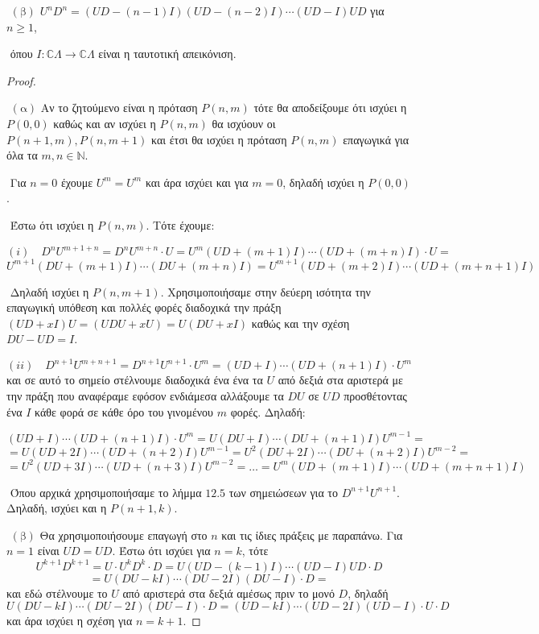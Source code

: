 \documentclass[oneside,a4paper]{article}
\begin{document}
$ $\newline
$(\text{β} )$ $U^n D^n = (UD - (n-1)I)(UD - (n-2)I) \cdots (UD-I)UD$ για $n\geq 1$,

$ $\newline
όπου $I : \mathbb{C}\Lambda \rightarrow \mathbb{C}\Lambda$ είναι η ταυτοτική απεικόνιση.

\begin{proof} $ $
    
    $ $\newline
    $(\text{α} )$ Αν το ζητούμενο είναι η πρόταση $P(n,m)$ τότε θα αποδείξουμε ότι ισχύει η $P(0,0)$ καθώς και αν ισχύει η $P(n,m)$ θα ισχύουν οι $P(n+1,m),P(n,m+1)$ και έτσι θα ισχύει η πρόταση $P(n,m)$ επαγωγικά για όλα τα $m,n \in \mathbb{N}$.

    $ $\newline 
    Για $n=0$ έχουμε $U^m = U^m$ και άρα ισχύει και για $m=0$, δηλαδή ισχύει η $P(0,0)$.

    $ $\newline
    Έστω ότι ισχύει η $P(n,m)$. Τότε έχουμε:

    $$(i) \quad D^n U^{m+1+n} = D^n U^{m+n} \cdot U = U^m (UD + (m+1)I)\cdots (UD + (m+n)I) \cdot U = $$
    $$U^{m+1} (DU + (m+1)I) \cdots (DU + (m+n)I) = U^{m+1} (UD+(m+2)I) \cdots (UD+(m+n+1)I)$$ 
    
    $ $\newline
    Δηλαδή ισχύει η $P(n,m+1)$. Χρησιμοποιήσαμε στην δεύερη ισότητα την επαγωγική υπόθεση και πολλές φορές διαδοχικά την πράξη $(UD+xI)U = (UDU+xU) = U(DU+xI)$ καθώς και την σχέση $DU-UD=I$.


    $$(ii) \quad D^{n+1}U^{m+n+1} = D^{n+1}U^{n+1} \cdot U^{m} = (UD+I)\cdots (UD+(n+1)I) \cdot U^m $$ και σε αυτό το σημείο στέλνουμε διαδοχικά ένα ένα τα $U$ από δεξιά στα αριστερά με την πράξη που αναφέραμε εφόσον ενδιάμεσα αλλάξουμε τα $DU$ σε $UD$ προσθέτοντας ένα $I$ κάθε φορά σε κάθε όρο του γινομένου $m$ φορές. Δηλαδή:

    $$(UD+I)\cdots (UD+(n+1)I) \cdot U^m = U(DU+I)\cdots(DU+(n+1)I)U^{m-1} = $$
    $$ = U (UD+2I) \cdots (UD + (n+2)I) U^{m-1} = U^2 (DU+2I) \cdots (DU+(n+2)I) U^{m-2} =  $$
    $$ = U^2 (UD+3I) \cdots (UD + (n+3)I)U^{m-2} = \ldots = U^m (UD + (m+1)I) \cdots (UD + (m+n+1)I)$$

    $ $\newline
    Όπου αρχικά χρησιμοποιήσαμε το λήμμα $12.5$ των σημειώσεων για το $D^{n+1}U^{n+1}$. Δηλαδή, ισχύει και η $P(n+1,k)$.

    $ $\newline
    $(\text{β} )$ Θα χρησιμοποιήσουμε επαγωγή στο $n$ και τις ίδιες πράξεις με παραπάνω. Για $n=1$ είναι $UD = UD$. Έστω ότι ισχύει για $n=k$, τότε 
    $$U^{k+1}D^{k+1} = U \cdot U^k D^k \cdot D = U ( UD - (k-1)I) \cdots (UD-I)UD \cdot D $$
    $$ = U (DU -kI)\cdots (DU-2I)(DU-I)\cdot D = $$ και εδώ στέλνουμε το $U$ από αριστερά στα δεξιά αμέσως πριν το μονό $D$, δηλαδή
    $$U(DU-kI)\cdots(DU-2I)(DU-I)\cdot D = (UD-kI)\cdots( UD-2I)(UD-I) \cdot U \cdot D$$ και άρα ισχύει η σχέση για $n=k+1$.
\end{proof}
\end{document}
